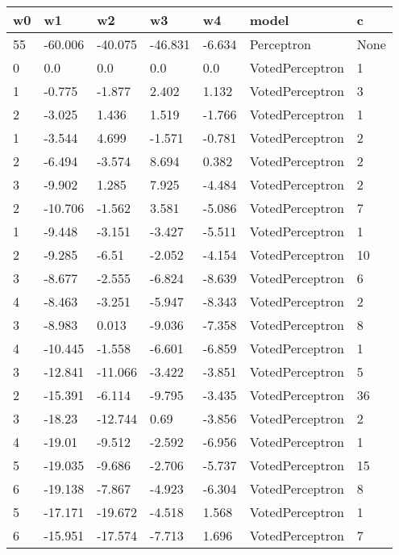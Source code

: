 \begin{tabular}{lllllll}
\toprule
w0 &      w1 &      w2 &      w3 &      w4 &              model &    c \\
\midrule
55 & -60.006 & -40.075 & -46.831 &  -6.634 &         Perceptron & None \\
 0 &     0.0 &     0.0 &     0.0 &     0.0 &    VotedPerceptron &    1 \\
 1 &  -0.775 &  -1.877 &   2.402 &   1.132 &    VotedPerceptron &    3 \\
 2 &  -3.025 &   1.436 &   1.519 &  -1.766 &    VotedPerceptron &    1 \\
 1 &  -3.544 &   4.699 &  -1.571 &  -0.781 &    VotedPerceptron &    2 \\
 2 &  -6.494 &  -3.574 &   8.694 &   0.382 &    VotedPerceptron &    2 \\
 3 &  -9.902 &   1.285 &   7.925 &  -4.484 &    VotedPerceptron &    2 \\
 2 & -10.706 &  -1.562 &   3.581 &  -5.086 &    VotedPerceptron &    7 \\
 1 &  -9.448 &  -3.151 &  -3.427 &  -5.511 &    VotedPerceptron &    1 \\
 2 &  -9.285 &   -6.51 &  -2.052 &  -4.154 &    VotedPerceptron &   10 \\
 3 &  -8.677 &  -2.555 &  -6.824 &  -8.639 &    VotedPerceptron &    6 \\
 4 &  -8.463 &  -3.251 &  -5.947 &  -8.343 &    VotedPerceptron &    2 \\
 3 &  -8.983 &   0.013 &  -9.036 &  -7.358 &    VotedPerceptron &    8 \\
 4 & -10.445 &  -1.558 &  -6.601 &  -6.859 &    VotedPerceptron &    1 \\
 3 & -12.841 & -11.066 &  -3.422 &  -3.851 &    VotedPerceptron &    5 \\
 2 & -15.391 &  -6.114 &  -9.795 &  -3.435 &    VotedPerceptron &   36 \\
 3 &  -18.23 & -12.744 &    0.69 &  -3.856 &    VotedPerceptron &    2 \\
 4 &  -19.01 &  -9.512 &  -2.592 &  -6.956 &    VotedPerceptron &    1 \\
 5 & -19.035 &  -9.686 &  -2.706 &  -5.737 &    VotedPerceptron &   15 \\
 6 & -19.138 &  -7.867 &  -4.923 &  -6.304 &    VotedPerceptron &    8 \\
 5 & -17.171 & -19.672 &  -4.518 &   1.568 &    VotedPerceptron &    1 \\
 6 & -15.951 & -17.574 &  -7.713 &   1.696 &    VotedPerceptron &    7 \\

\end{tabular}
